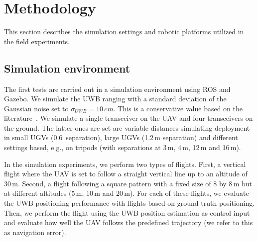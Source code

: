 


\section{Methodology}

This section describes the simulation settings and robotic platforms utilized in the field experiments.

\subsection{Simulation environment}

The first tests are carried out in a simulation environment using ROS and Gazebo. We simulate the UWB ranging with a standard deviation of the Gaussian noise set to $\sigma_{UWB} = 10\,cm$. This is a conservative value based on the literature~\cite{queralta2020uwb}. We simulate a single transceiver on the UAV and four transceivers on the ground. The latter ones are set are variable distances simulating deployment in small UGVs (0.6\, separation), large UGVs (1.2\,m separation) and different settings based, e.g., on tripods (with separations at 3\,m, 4\,m, 12\,m and 16\,m).

In the simulation experiments, we perform two types of flights. First, a vertical flight where the UAV is set to follow a straight vertical line up to an altitude of 30\,m. Second, a flight following a square pattern with a fixed size of 8 by 8\,m but at different altitudes (5\,m, 10\,m and 20\,m). For each of these flights, we evaluate the UWB positioning performance with flights based on ground truth positioning. Then, we perform the flight using the UWB position estimation as control input and evaluate how well the UAV follows the predefined trajectory (we refer to this as navigation error).


